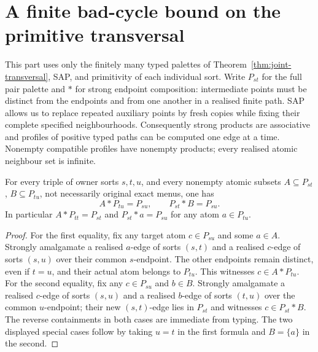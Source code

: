 \section{A finite bad-cycle bound on the primitive transversal}
\label{sec:finite-locality}

This part uses only the finitely many typed palettes of
Theorem~\ref{thm:joint-transversal}, SAP, and primitivity of each
individual sort. Write $P_{st}$ for the full pair palette and $*$
for strong endpoint composition: intermediate points must be distinct
from the endpoints and from one another in a realised finite path.
SAP allows us to replace repeated auxiliary points by fresh copies
while fixing their complete specified neighbourhoods. Consequently
strong products are associative and profiles of positive typed paths
can be computed one edge at a time. Nonempty compatible profiles have
nonempty products; every realised atomic neighbour set is infinite.

\begin{lemma}
\label{lem:locality-absorb}
For every triple of owner sorts $s,t,u$, and every nonempty
atomic subsets $A\subseteq P_{st}$, $B\subseteq P_{tu}$,
not necessarily original exact menus, one has
\[
 A*P_{tu}=P_{su},\qquad P_{st}*B=P_{su}.
\]
In particular $A*P_{tt}=P_{st}$ and
$P_{st}*a=P_{su}$ for any atom $a\in P_{tu}$.
\end{lemma}
\begin{proof}
For the first equality, fix any target atom $c\in P_{su}$
and some $a\in A$.  Strongly amalgamate a realised $a$-edge
of sorts $(s,t)$ and a realised $c$-edge of sorts $(s,u)$
over their common $s$-endpoint.  The other endpoints remain
distinct, even if $t=u$, and their actual atom belongs to
$P_{tu}$.  This witnesses $c\in A*P_{tu}$.
For the second equality, fix any $c\in P_{su}$ and $b\in B$.
Strongly amalgamate a realised $c$-edge of sorts $(s,u)$
and a realised $b$-edge of sorts $(t,u)$ over the common
$u$-endpoint; their new $(s,t)$-edge lies in $P_{st}$ and
witnesses $c\in P_{st}*B$.  The reverse containments in
both cases are immediate from typing.  The two displayed
special cases follow by taking $u=t$ in the first formula
and $B=\{a\}$ in the second.
\end{proof}

